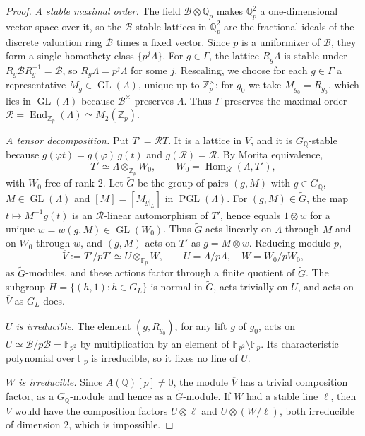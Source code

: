 \documentclass[11pt]{article}
\newcommand{\Q}{\mathbb Q}
\newcommand{\Z}{\mathbb Z}
\newcommand{\F}{\mathbb F}
\DeclareMathOperator{\End}{End}
\DeclareMathOperator{\GL}{GL}
\DeclareMathOperator{\PGL}{PGL}
\DeclareMathOperator{\Hom}{Hom}
\begin{document}
\begin{proof}
\emph{A stable maximal order.} The field \(\mathcal B\otimes\Q_p\) makes
\(\Q_p^2\) a one-dimensional vector space over it, so the
\(\mathcal B\)-stable lattices in \(\Q_p^2\) are the fractional ideals
of the discrete valuation ring \(\mathcal B\) times a fixed vector.
Since \(p\) is a uniformizer of \(\mathcal B\), they form a single
homothety class \(\{p^j\Lambda\}\). For \(g\in\Gamma\), the lattice
\(R_g\Lambda\) is stable under \(R_g\mathcal BR_g^{-1}=\mathcal B\), so
\(R_g\Lambda=p^j\Lambda\) for some \(j\). Rescaling, we choose for each
\(g\in\Gamma\) a representative \(M_g\in\GL(\Lambda)\), unique up to
\(\Z_p^\times\); for \(g_0\) we take \(M_{g_0}=R_{g_0}\), which lies in
\(\GL(\Lambda)\) because \(\mathcal B^\times\) preserves \(\Lambda\).
Thus \(\Gamma\) preserves the maximal order
\(\mathcal R=\End_{\Z_p}(\Lambda)\simeq M_2(\Z_p)\).

\emph{A tensor decomposition.} Put \(T'=\mathcal RT\). It is a lattice
in \(V\), and it is \(G_{\Q}\)-stable because
\(g(\varphi t)=g(\varphi)\,g(t)\) and \(g(\mathcal R)=\mathcal R\). By
Morita equivalence,
\[
 T'\simeq\Lambda\otimes_{\Z_p}W_0,\qquad W_0=\Hom_{\mathcal R}(\Lambda,T'),
\]
with \(W_0\) free of rank \(2\). Let \(\widetilde G\) be the group of
pairs \((g,M)\) with \(g\in G_{\Q}\), \(M\in\GL(\Lambda)\) and
\([M]=[M_{g|_L}]\) in \(\PGL(\Lambda)\). For \((g,M)\in\widetilde G\),
the map \(t\mapsto M^{-1}g(t)\) is an \(\mathcal R\)-linear automorphism
of \(T'\), hence equals \(1\otimes w\) for a unique
\(w=w(g,M)\in\GL(W_0)\). Thus \(\widetilde G\) acts linearly on
\(\Lambda\) through \(M\) and on \(W_0\) through \(w\), and \((g,M)\)
acts on \(T'\) as \(g=M\otimes w\). Reducing modulo \(p\),
\[
 \overline V:=T'/pT'\simeq U\otimes_{\F_p}W,\qquad
 U=\Lambda/p\Lambda,\quad W=W_0/pW_0,
\]
as \(\widetilde G\)-modules, and these actions factor through a finite
quotient of \(\widetilde G\). The subgroup
\(H=\{(h,1):h\in G_L\}\) is normal in \(\widetilde G\), acts trivially
on \(U\), and acts on \(\overline V\) as \(G_L\) does.

\emph{\(U\) is irreducible.} The element \((g,R_{g_0})\), for any lift
\(g\) of \(g_0\), acts on \(U\simeq\mathcal B/p\mathcal B=\F_{p^2}\) by
multiplication by an element of \(\F_{p^2}\setminus\F_p\). Its
characteristic polynomial over \(\F_p\) is irreducible, so it fixes no
line of \(U\).

\emph{\(W\) is irreducible.} Since \(A(\Q)[p]\neq0\), the module
\(\overline V\) has a trivial composition factor, as a
\(G_{\Q}\)-module and hence as a \(\widetilde G\)-module. If \(W\) had a
stable line \(\ell\), then \(\overline V\) would have the composition
factors \(U\otimes\ell\) and \(U\otimes(W/\ell)\), both irreducible of
dimension \(2\), which is impossible.


\end{proof}
\end{document}
